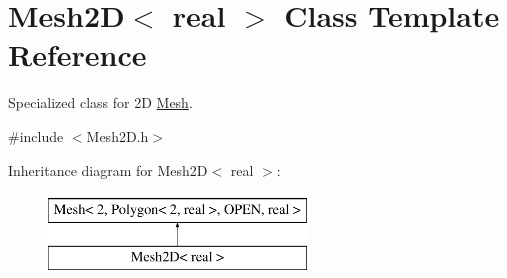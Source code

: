 \hypertarget{class_mesh2_d}{\section{\-Mesh2\-D$<$ real $>$ \-Class \-Template \-Reference}
\label{class_mesh2_d}
}


\-Specialized class for 2\-D \hyperlink{class_mesh}{\-Mesh}.  




{\ttfamily \#include $<$\-Mesh2\-D.\-h$>$}

\-Inheritance diagram for \-Mesh2\-D$<$ real $>$\-:\begin{figure}[H]
\begin{center}
\leavevmode
\includegraphics[height=2.000000cm]{class_mesh2_d}
\end{center}
\end{figure}
